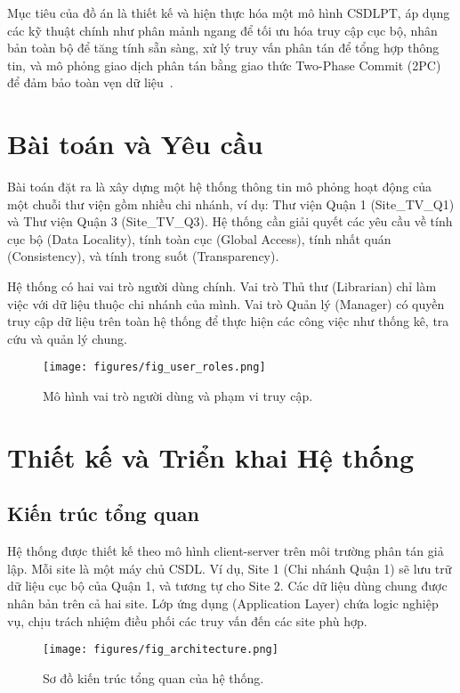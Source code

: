 \documentclass[conference]{IEEEtran}
\begin{document}
Mục tiêu của đồ án là thiết kế và hiện thực hóa một mô hình CSDLPT, áp dụng các kỹ thuật chính như phân mảnh ngang để tối ưu hóa truy cập cục bộ, nhân bản toàn bộ để tăng tính sẵn sàng, xử lý truy vấn phân tán để tổng hợp thông tin, và mô phỏng giao dịch phân tán bằng giao thức Two-Phase Commit (2PC) để đảm bảo toàn vẹn dữ liệu~\cite{ozsu_valduriez_2020}.

\section{Bài toán và Yêu cầu}
Bài toán đặt ra là xây dựng một hệ thống thông tin mô phỏng hoạt động của một chuỗi thư viện gồm nhiều chi nhánh, ví dụ: Thư viện Quận 1 (Site\_TV\_Q1) và Thư viện Quận 3 (Site\_TV\_Q3). Hệ thống cần giải quyết các yêu cầu về tính cục bộ (Data Locality), tính toàn cục (Global Access), tính nhất quán (Consistency), và tính trong suốt (Transparency).

Hệ thống có hai vai trò người dùng chính. Vai trò Thủ thư (Librarian) chỉ làm việc với dữ liệu thuộc chi nhánh của mình. Vai trò Quản lý (Manager) có quyền truy cập dữ liệu trên toàn hệ thống để thực hiện các công việc như thống kê, tra cứu và quản lý chung.

\begin{figure}[H]
\centering
\texttt{[image: figures/fig\_user\_roles.png]} 
\caption{Mô hình vai trò người dùng và phạm vi truy cập.}
\label{fig_user_roles}
\end{figure}

\section{Thiết kế và Triển khai Hệ thống}
\subsection{Kiến trúc tổng quan}
Hệ thống được thiết kế theo mô hình client-server trên môi trường phân tán giả lập. Mỗi site là một máy chủ CSDL. Ví dụ, Site 1 (Chi nhánh Quận 1) sẽ lưu trữ dữ liệu cục bộ của Quận 1, và tương tự cho Site 2. Các dữ liệu dùng chung được nhân bản trên cả hai site. Lớp ứng dụng (Application Layer) chứa logic nghiệp vụ, chịu trách nhiệm điều phối các truy vấn đến các site phù hợp.

\begin{figure}[H]
\centering
\texttt{[image: figures/fig\_architecture.png]} 
\caption{Sơ đồ kiến trúc tổng quan của hệ thống.}
\label{fig_architecture}
\end{figure}
\end{document}

